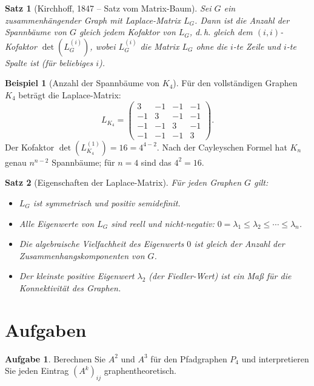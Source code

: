 ﻿\documentclass[a4paper,12pt,openany,oneside]{book}
\theoremstyle{definition}
\newtheorem{beispiel}{Beispiel}[chapter]
\newtheorem{aufgabe}{Aufgabe}[chapter]
\theoremstyle{plain}
\newtheorem{satz}{Satz}[chapter]
\theoremstyle{remark}
\begin{document}
\begin{satz}[Kirchhoff, 1847 -- Satz vom Matrix-Baum]
  Sei $G$ ein zusammenh\"angender Graph mit Laplace-Matrix $L_G$. Dann ist
  die Anzahl der Spannb\"aume von $G$ gleich jedem Kofaktor von $L_G$,
  d.\,h. gleich dem $(i,i)$-Kofaktor $\det(L_G^{(i)})$, wobei $L_G^{(i)}$
  die Matrix $L_G$ ohne die $i$-te Zeile und $i$-te Spalte ist (f\"ur
  beliebiges $i$).
\end{satz}

\begin{beispiel}[Anzahl der Spannb\"aume von $K_4$]
  F\"ur den vollst\"andigen Graphen $K_4$ betr\"agt die Laplace-Matrix:
  \[
    L_{K_4} = \begin{pmatrix}
                3 & -1 & -1 & -1\\
               -1 &  3 & -1 & -1\\
               -1 & -1 &  3 & -1\\
               -1 & -1 & -1 &  3
              \end{pmatrix}.
  \]
  Der Kofaktor $\det(L_{K_4}^{(1)}) = 16 = 4^{4-2}$. Nach der
  Cayleyschen Formel hat $K_n$ genau $n^{n-2}$ Spannb\"aume; f\"ur
  $n = 4$ sind das $4^2 = 16$. \checkmark
\end{beispiel}

\begin{satz}[Eigenschaften der Laplace-Matrix]
  F\"ur jeden Graphen $G$ gilt:
  \begin{itemize}
    \item $L_G$ ist symmetrisch und positiv semidefinit.
    \item Alle Eigenwerte von $L_G$ sind reell und nicht-negativ:
          $0 = \lambda_1 \leq \lambda_2 \leq \cdots \leq \lambda_n$.
    \item Die algebraische Vielfachheit des Eigenwerts $0$ ist gleich der
          Anzahl der Zusammenhangskomponenten von $G$.
    \item Der kleinste positive Eigenwert $\lambda_2$ (der
          \emph{Fiedler-Wert}) ist ein Ma\ss{} f\"ur die Konnektivit\"at
          des Graphen.
  \end{itemize}
\end{satz}

\section{Aufgaben}

\begin{aufgabe}
  Berechnen Sie $A^2$ und $A^3$ f\"ur den Pfadgraphen $P_4$ und
  interpretieren Sie jeden Eintrag $(A^k)_{ij}$ graphentheoretisch.
\end{aufgabe}
\end{document}
